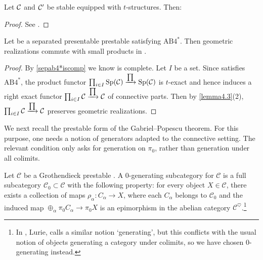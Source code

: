 \documentclass[a4paper,10pt, oneside]{amsart}
\begin{document}
	\begin{lem}\label{lemma4.3}
		Let $\mathcal{C}$ and $\mathcal{C}'$ be stable \infcats equipped with $t$-structures. Then:
	\end{lem}
	\begin{proof}
		See \cite[Lemma 3.6]{hattt}.
	\end{proof}
	\begin{cor}\label{prodcommutegeom}
		Let \mcc be a separated presentable prestable \infcat satisfying $\mathrm{AB4}^*$. Then geometric realizations  commute with small products in \mcc.
	\end{cor}
	\begin{proof}
		By \cref{sepab4*iscomp} we know \mcc is  complete. Let $I$ be a set. Since \mcc satisfies $\mathrm{AB4}^*$, the product functor $\prod_{i\in I}\mathrm{Sp}(\mathcal{C})\xrightarrow{\prod} \mathrm{Sp}(\mathcal{C})$ is $t$-exact and hence induces a right exact functor $\prod_{i\in I}\mathcal{C}\xrightarrow{\prod}\mathcal{C}$ of  connective parts. Then by \cref{lemma4.3}(2), $\prod_{i\in I}\mathcal{C}\xrightarrow{\prod}\mathcal{C}$ preserves geometric realizations.
	\end{proof}
	We next recall the prestable form of the Gabriel--Popescu theorem. For this purpose, one needs a notion of generators adapted to the connective setting. The relevant condition only asks for generation on $\pi_0$, rather than generation under all colimits.
	\begin{de}\label{generasub}
		Let $\mathcal{C}$ be a Grothendieck prestable \infcat. A $0$-generating 
		subcategory for $\mathcal{C}$ is a full subcategory $\mathcal{C}_0 \subset \mathcal{C}$ with the 
		following property: for every object $X \in \mathcal{C}$, there exists a collection of maps 
		$\rho_\alpha: C_\alpha \rightarrow X$, where each $C_\alpha$ belongs to $\mathcal{C}_0$ and 
		the induced map $\oplus_\alpha \pi_0 C_\alpha \rightarrow \pi_0 X$ is an epimorphism in the 
		abelian category $\mathcal{C}^{\heartsuit}$.\footnote{In 
		\cite[Definition C.2.1.1]{SAG}, Lurie, calls a similar notion `generating', but 
		this conflicts with the usual notion of objects generating a category under 
		colimits, so we have chosen $0$-generating instead.}
	\end{de}
\end{document}
